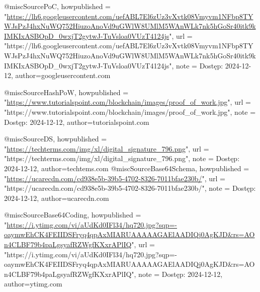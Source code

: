 @misc{SourcePoC,
    howpublished = "\url{https://lh6.googleusercontent.com/uefABL7El6zUz3vXvtk08Vmyvm1NFbp8TYWJsPzJ4hxNuWQ752HiuzoAnoVd9uGWlW8UMlM5WAnWLk7nk5hGoSr40itk9kIMKIxASBOpD_0wxjT2gytwJ-TuVsloa0VUzT4124js}",
    url = "https://lh6.googleusercontent.com/uefABL7El6zUz3vXvtk08Vmyvm1NFbp8TYWJsPzJ4hxNuWQ752HiuzoAnoVd9uGWlW8UMlM5WAnWLk7nk5hGoSr40itk9kIMKIxASBOpD_0wxjT2gytwJ-TuVsloa0VUzT4124js",
    note = {Dostęp: 2024-12-12},
author={googleusercontent.com}
}


@misc{SourceHashPoW,
    howpublished = "\url{https://www.tutorialspoint.com/blockchain/images/proof_of_work.jpg}",
    url = "https://www.tutorialspoint.com/blockchain/images/proof_of_work.jpg",
    note = {Dostęp: 2024-12-12},
author={tutorialspoint.com}
}


@misc{SourceDS,
    howpublished = "\url{https://techterms.com/img/xl/digital_signature_796.png}",
    url = "https://techterms.com/img/xl/digital_signature_796.png",
    note = {Dostęp: 2024-12-12},
author={techtems.com}
}
@misc{SourceBase64Schema,
    howpublished = "\url{https://ucarecdn.com/cd938e5b-39b5-4702-8326-7011bfae230b/}",
    url = "https://ucarecdn.com/cd938e5b-39b5-4702-8326-7011bfae230b/",
    note = {Dostęp: 2024-12-12},
author={ucarecdn.com}
}


@misc{SourceBase64Coding,
    howpublished = "\url{https://i.ytimg.com/vi/aUdKd0IFl34/hq720.jpg?sqp=-oaymwEhCK4FEIIDSFryq4qpAxMIARUAAAAAGAElAADIQj0AgKJD&rs=AOn4CLBF79b4paLgsyafRZWgfKXxrAPlIQ}",
    url = "https://i.ytimg.com/vi/aUdKd0IFl34/hq720.jpg?sqp=-oaymwEhCK4FEIIDSFryq4qpAxMIARUAAAAAGAElAADIQj0AgKJD&rs=AOn4CLBF79b4paLgsyafRZWgfKXxrAPlIQ",
    note = {Dostęp: 2024-12-12},
author={ytimg.com}
}
